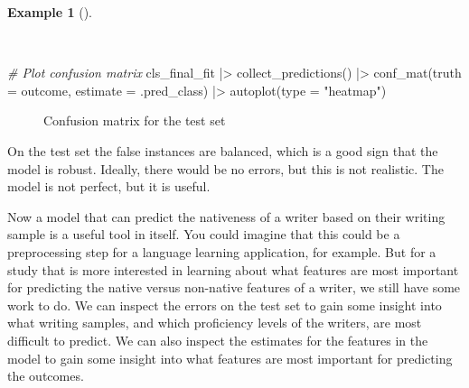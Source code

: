 \documentclass[
  letterpaper,
]{book}
\newenvironment{Shaded}{\begin{snugshade}}{\end{snugshade}}
\newcommand{\AttributeTok}[1]{\textcolor[rgb]{0.00,0.00,0.00}{#1}}
\newcommand{\CommentTok}[1]{\textcolor[rgb]{0.00,0.00,0.00}{\textit{#1}}}
\newcommand{\FunctionTok}[1]{\textcolor[rgb]{0.00,0.00,0.00}{#1}}
\newcommand{\NormalTok}[1]{\textcolor[rgb]{0.00,0.00,0.00}{#1}}
\newcommand{\SpecialCharTok}[1]{\textcolor[rgb]{0.00,0.00,0.00}{#1}}
\newcommand{\StringTok}[1]{\textcolor[rgb]{0.00,0.00,0.00}{#1}}
\theoremstyle{definition}
\newtheorem{example}{Example}[chapter]
\theoremstyle{remark}
\begin{document}
\begin{example}[]\protect\hypertarget{exm-predict-class-tune-hyperparameters-evaluate-test-confusion}{}\label{exm-predict-class-tune-hyperparameters-evaluate-test-confusion}

~

\begin{Shaded}
\begin{Highlighting}[]
\CommentTok{\# Plot confusion matrix}
\NormalTok{cls\_final\_fit }\SpecialCharTok{|\textgreater{}}
  \FunctionTok{collect\_predictions}\NormalTok{() }\SpecialCharTok{|\textgreater{}}
  \FunctionTok{conf\_mat}\NormalTok{(}\AttributeTok{truth =}\NormalTok{ outcome, }\AttributeTok{estimate =}\NormalTok{ .pred\_class) }\SpecialCharTok{|\textgreater{}}
  \FunctionTok{autoplot}\NormalTok{(}\AttributeTok{type =} \StringTok{"heatmap"}\NormalTok{)}
\end{Highlighting}
\end{Shaded}

\begin{figure}[!htb]


\caption{\label{fig-predict-class-tune-hyperparameters-evaluate-test-confusion}Confusion
matrix for the test set}

\end{figure}%

\end{example}

On the test set the false instances are balanced, which is a good sign
that the model is robust. Ideally, there would be no errors, but this is
not realistic. The model is not perfect, but it is useful.

Now a model that can predict the nativeness of a writer based on their
writing sample is a useful tool in itself. You could imagine that this
could be a preprocessing step for a language learning application, for
example. But for a study that is more interested in learning about what
features are most important for predicting the native versus non-native
features of a writer, we still have some work to do. We can inspect the
errors on the test set to gain some insight into what writing samples,
and which proficiency levels of the writers, are most difficult to
predict. We can also inspect the estimates for the features in the model
to gain some insight into what features are most important for
predicting the outcomes.
\end{document}
